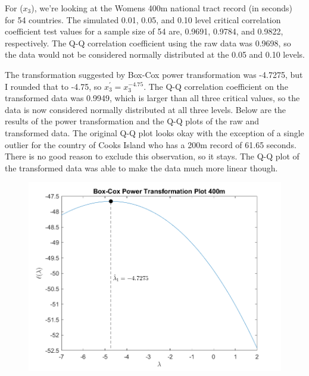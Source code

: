 For ($x_{3}$), we're looking at the Womens 400m national tract record (in seconds) for 54 countries. The simulated 0.01, 0.05, and 0.10 level critical correlation coefficient test values for a sample size of 54 are, 0.9691, 0.9784, and 0.9822, respectively. The Q-Q correlation coefficient using the raw data was 0.9698, so the data would not be considered normally distributed at the 0.05 and 0.10 levels.

The transformation suggested by Box-Cox power transformation was -4.7275, but I rounded that to -4.75, so $x_{3}^{\prime} = x_{3}^{-4.75}$.
The Q-Q correlation coefficient on the transformed data was 0.9949, which is larger than all three critical values, so the data is now considered normally distributed at all three levels.
Below are the results of the power transformation and the Q-Q plots of the raw and transformed data.
The original Q-Q plot looks okay with the exception of a single outlier for the country of Cooks Island who has a 200m record of 61.65 seconds. There is no good reason to exclude this observation, so it stays. The Q-Q plot of the transformed data was able to make the data much more linear though.

\begin{center}
    \begin{figure}[H]
        \centering
        \includegraphics[scale=0.6]{./matlab/chapter-4/sol4.36.power.3.png}
    \end{figure}
\end{center}

